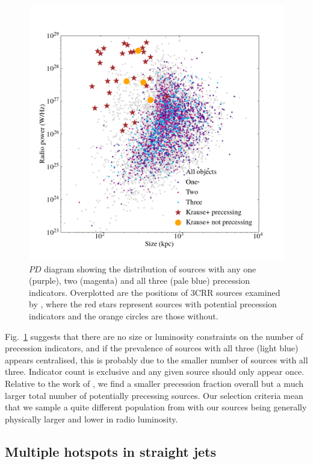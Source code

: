\documentclass{aa}
\begin{document}
\begin{figure}
\includegraphics[width=1\linewidth]{Images/results/precession_distribution_largefont2024.png}
\caption{$PD$ diagram showing the distribution of sources with any one (purple), two (magenta) and all three (pale blue) precession indicators. Overplotted are the positions of 3CRR sources examined by \cite{krause18}, where the red stars represent sources with potential precession indicators and the orange circles are those without.}
\label{fig:precession_dist.png}
\end{figure}

Fig.~\ref{fig:precession_dist.png} suggests that there are no size or luminosity constraints on the number of precession indicators, and if the prevalence of sources with all three (light blue) appears centralised, this is probably due to the smaller number of sources with all three. Indicator count is exclusive and any given source should only appear once. Relative to the work of \cite{krause18}, we find a smaller precession fraction overall but a much larger total number of potentially precessing sources. Our selection criteria mean that we sample a quite different population from \cite{krause18} with our sources being generally physically larger and lower in radio luminosity.

\subsection{Multiple hotspots in straight jets}
\end{document}
